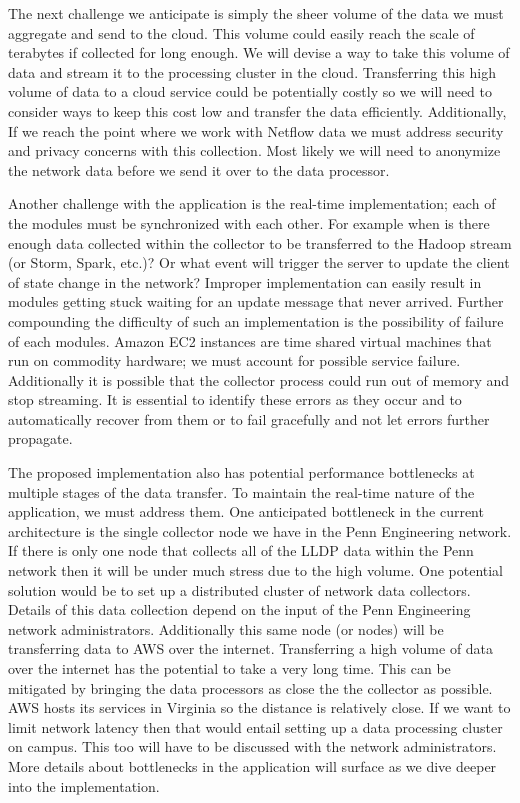 \documentclass{sig-alternate}
\begin{document}
The next challenge we anticipate is simply the sheer volume of the data we must
aggregate and send to the cloud. This volume could easily reach the scale of
terabytes if collected for long enough. We will devise a way to take this volume
of data and stream it to the processing cluster in the cloud. Transferring this
high volume of data to a cloud service could be potentially costly so we will
need to consider ways to keep this cost low and transfer the data efficiently.
Additionally, If we reach the point where we work with Netflow data we must
address security and privacy concerns with this collection. Most likely we will
need to anonymize the network data before we send it over to the data processor.

Another challenge with the application is the real-time implementation; each of
the modules must be synchronized with each other. For example when is there
enough data collected within the collector to be transferred to the Hadoop
stream (or Storm, Spark, etc.)? Or what event will trigger the server to update
the client of state change in the network? Improper implementation can easily
result in modules getting stuck waiting for an update message that never
arrived. Further compounding the difficulty of such an implementation is the
possibility of failure of each modules. Amazon EC2 instances are time shared
virtual machines that run on commodity hardware; we must account for possible
service failure. Additionally it is possible that the collector process could
run out of memory and stop streaming. It is essential to identify these errors
as they occur and to automatically recover from them or to fail gracefully and
not let errors further propagate.

The proposed implementation also has potential performance bottlenecks at
multiple stages of the data transfer. To maintain the real-time nature of the
application, we must address them. One anticipated bottleneck in the current
architecture is the single collector node we have in the Penn Engineering
network. If there is only one node that collects all of the LLDP data within the
Penn network then it will be under much stress due to the high volume. One
potential solution would be to set up a distributed cluster of network data
collectors. Details of this data collection depend on the input of the Penn
Engineering network administrators. Additionally this same node (or nodes) will
be transferring data to AWS over the internet. Transferring a high volume of
data over the internet has the potential to take a very long time. This can be
mitigated by bringing the data processors as close the the collector as
possible. AWS hosts its services in Virginia so the distance is relatively
close. If we want to limit network latency then that would entail setting up a
data processing cluster on campus. This too will have to be discussed with the
network administrators. More details about bottlenecks in the application will
surface as we dive deeper into the implementation.
\end{document}
